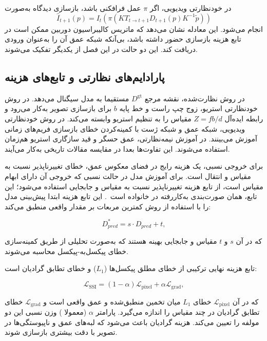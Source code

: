در خودنظارتی ویدیویی، اگر $\pi$ عمل فرافکنی باشد، بازسازی دیدگاه به‌صورت
\begin{equation}
 \hat I_{t+1}(p)=I_t\left(\pi\left(KT_{t\rightarrow t+1}D_{t+1}(p)K^{-1}\tilde p\right)\right)
\end{equation}
انجام می‌شود. این معادله نشان می‌دهد که ماتریس کالیبراسیون دوربین ممکن است در تابع هزینه بازسازی حضور داشته باشد، بی‌آنکه شبکه عمق آن را به‌عنوان ورودی دریافت کند. این دو حالت در این فصل از یکدیگر تفکیک می‌شوند.

\subsection{پارادایم‌های نظارتی و تابع‌های هزینه}
\label{subsec:silog_absolute_loss}
در روش نظارت‌شده، نقشه مرجع $D^{\mathrm{gt}}$ مستقیما به مدل سیگنال می‌دهد. در روش خودنظارتی استریو، زوج چپ راست و خط پایه $b$ برای بازسازی تصویر به‌کار می‌رود و رابطه ایده‌آل $Z=fb/d$ مقیاس را به تنظیم استریو وابسته می‌کند. در روش خودنظارتی ویدیویی، شبکه عمق و شبکه ژست با کمینه‌کردن خطای بازسازی فریم‌های زمانی آموزش می‌بینند. در آموزش نیمه‌نظارتی، عمق حسگر و قید سازگاری استریو هم‌زمان استفاده می‌شوند. این تفاوت‌ها بعدا در مقایسه مقالات تاریخی به‌کار می‌آیند.

برای خروجی نسبی، یک هزینه رایج در فضای معکوس عمق، خطای تغییرناپذیر نسبت به مقیاس و انتقال است.
برای آموزش مدل در حالت نسبی که خروجی آن دارای ابهام مقیاس است، از تابع هزینه تغییرناپذیر نسبت به مقیاس و جابجایی استفاده می‌شود؛ این تابع، همان صورت‌بندی به‌کاررفته در خانواده  است~\cite{Ranftl2019Robust}. این تابع هزینه ابتدا پیش‌بینی مدل را با استفاده از روش کمترین مربعات بر مقدار واقعی منطبق می‌کند:

\begin{equation}
D^*_{pred} = s \cdot D_{pred} + t,
\end{equation}

که در آن $s$ و $t$ مقیاس و جابجایی بهینه هستند که به‌صورت تحلیلی از طریق کمینه‌سازی خطای پیکسل‌به-پیکسل محاسبه می‌شوند.

تابع هزینه نهایی ترکیبی از خطای مطلق پیکسل‌ها ($L_1$) و خطای تطابق گرادیان است:

\begin{equation}
\mathcal{L}_{\text{SSI}} = (1 - \alpha) \mathcal{L}_{\text{pixel}} + \alpha \mathcal{L}_{\text{grad}},
\end{equation}

که در آن $\mathcal{L}_{\text{pixel}}$ خطای $L_1$ میان تخمین منطبق‌شده و عمق واقعی است و $\mathcal{L}_{\text{grad}}$ خطای تطابق گرادیان در چند مقیاس را اندازه می‌گیرد. پارامتر $\alpha$ (معمولا ) وزن نسبی این دو مولفه را تعیین می‌کند. هزینه گرادیان باعث می‌شود که لبه‌های عمق و ناپیوستگی‌ها در تصویر با دقت بیشتری بازسازی شوند.

